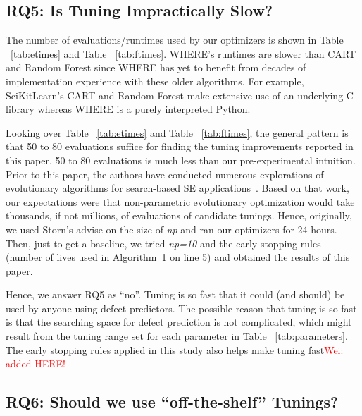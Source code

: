 \documentclass{sig-alternative}
\newcommand{\wei}[1]{\textcolor{red}{Wei: #1}}
\newcommand{\tab}[1]{Table ~\ref{tab:#1}}
\begin{document}
\subsection{RQ5: Is Tuning Impractically Slow?}\label{sect:fast}
 
 
The number of evaluations/runtimes used by our optimizers is shown in \tab{etimes}
and \tab{ftimes}.
WHERE's runtimes are slower than CART and Random Forest since WHERE has yet to benefit from decades
of implementation experience with these older algorithms. For example, SciKitLearn's  CART and Random Forest
 make extensive use of an underlying C library whereas WHERE is a purely interpreted Python.

Looking over \tab{etimes} and \tab{ftimes}, the general pattern is that 50 to 80 evaluations suffice for finding the tuning
improvements reported in this paper. 
50 to 80 evaluations is  much less than our pre-experimental intuition.
Prior to this paper, the authors have conducted numerous explorations of evolutionary algorithms
for search-based SE applications~\cite{krall15,krall15:hm,fea02a,me07f,Green}. Based
on that work, our expectations were that non-parametric evolutionary optimization would
take thousands, if not millions, of evaluations of candidate tunings. Hence, originally,
we used Storn's advise on the size of {\em np} and ran our optimizers for 24 hours. 
Then, just
to get a baseline, we tried {\em np=10} and the early stopping rules (number of lives used in
Algorithm~1 on line 5) and obtained the results of this paper. 

Hence, we answer RQ5 as ``no''. Tuning is so fast that
it could (and should) be used by anyone using defect predictors. The possible reason that tuning is so fast is that the searching space for defect prediction is not complicated, which might result from the tuning range set for each parameter in \tab{parameters}. The early stopping rules applied in this study also helps make tuning fast\wei{added HERE!}

\subsection{RQ6: Should we use ``off-the-shelf'' Tunings?}\label{sect:variance}
 
\end{document}
